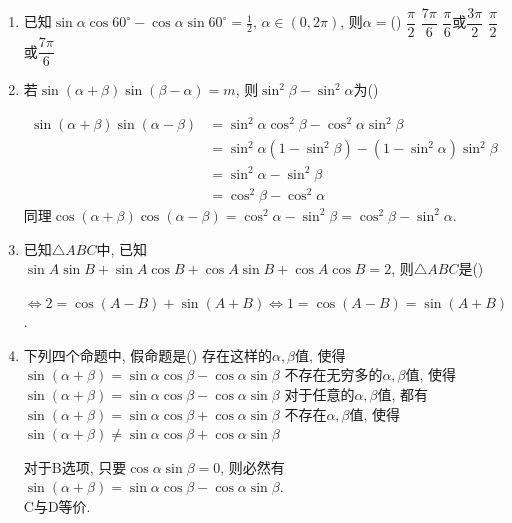 \begin{enumerate}
\item 已知$\sin\alpha\cos60^{\circ}-\cos\alpha\sin60^{\circ}=\frac{1}{2}$, $\alpha\in(0,2\pi)$, 则$\alpha=$\dotfill()
\xx
{$\dfrac{\pi}{2}$}
{$\dfrac{7\pi}{6}$}
{$\dfrac{\pi}{6}$或$\dfrac{3\pi}{2}$}
{$\dfrac{\pi}{2}$或$\dfrac{7\pi}{6}$}

\item 若$\sin(\alpha+\beta)\sin(\beta-\alpha)=m$, 则$\sin^2\beta-\sin^2\alpha$为\dotfill()
\begin{jieda}
\begin{align*}
\sin(\alpha+\beta)\sin(\alpha-\beta) 
& =\sin^2\alpha\cos^2\beta-\cos^2\alpha\sin^2\beta\\
& =\sin^2\alpha(1-\sin^2\beta)-(1-\sin^2\alpha)\sin^2\beta\\
& =\sin^2\alpha-\sin^2\beta\\
& =\cos^2\beta-\cos^2\alpha
\end{align*}
同理$\cos(\alpha+\beta)\cos(\alpha-\beta)=\cos^2\alpha-\sin^2\beta=\cos^2\beta-\sin^2\alpha$. 
\end{jieda}


\item 已知$\triangle{ABC}$中, 已知$\sin{A}\sin{B}+\sin{A}\cos{B}+\cos{A}\sin{B}+\cos{A}\cos{B}=2$, 则$\triangle{ABC}$是\dotfill()
\begin{jieda}
$\iff 2=\cos(A-B)+\sin(A+B)\iff 1=\cos(A-B)=\sin(A+B)$. 
\end{jieda}


\item 下列四个命题中, 假命题是\dotfill()
\xx
{存在这样的$\alpha,\beta$值, 使得$\sin(\alpha+\beta)=\sin\alpha\cos\beta-\cos\alpha\sin\beta$}
{不存在无穷多的$\alpha,\beta$值, 使得$\sin(\alpha+\beta)=\sin\alpha\cos\beta-\cos\alpha\sin\beta$}
{对于任意的$\alpha,\beta$值, 都有$\sin(\alpha+\beta)=\sin\alpha\cos\beta+\cos\alpha\sin\beta$}
{不存在$\alpha,\beta$值, 使得$\sin(\alpha+\beta)\neq\sin\alpha\cos\beta+\cos\alpha\sin\beta$}
\begin{jieda}
对于B选项, 只要$\cos\alpha\sin\beta=0$, 则必然有$\sin(\alpha+\beta)=\sin\alpha\cos\beta-\cos\alpha\sin\beta$. \\
C与D等价. 
\end{jieda}


\end{enumerate}
